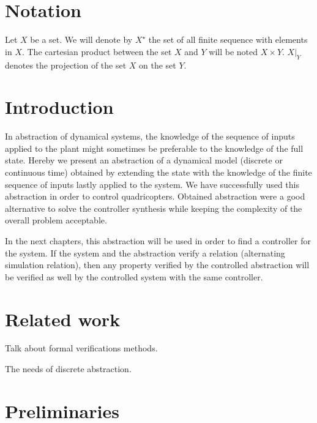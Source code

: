 \newcommand{\Cont}{\mathcal{C}}%
\section{Notation}
Let $X$ be a set. We will denote by $X^\star$ the set of all finite sequence with elements in $X$.
The cartesian product between the set $X$ and $Y$ will be noted $X \times Y$. $X|_Y$ denotes the projection of the set $X$ on the set $Y$.

\section{Introduction}
In abstraction of dynamical systems, the knowledge of the sequence of inputs applied to the plant might sometimes be preferable to the knowledge of the full state.
%
Hereby we present an abstraction of a dynamical model (discrete or continuous time) obtained by extending the state with the knowledge of the finite sequence of inputs lastly applied to the system.
We have successfully used this abstraction in order to control quadricopters. Obtained abstraction were a good alternative to solve the controller synthesis while keeping the complexity of the overall problem acceptable.


In the next chapters, this abstraction will be used in order to find a controller for the system.
If the system and the abstraction verify a relation (alternating simulation relation), then any property verified by the controlled abstraction will be verified as well by the controlled system with the same controller.


\section{Related work}
Talk about formal verifications methods.

The needs of discrete abstraction.


\section{Preliminaries}
